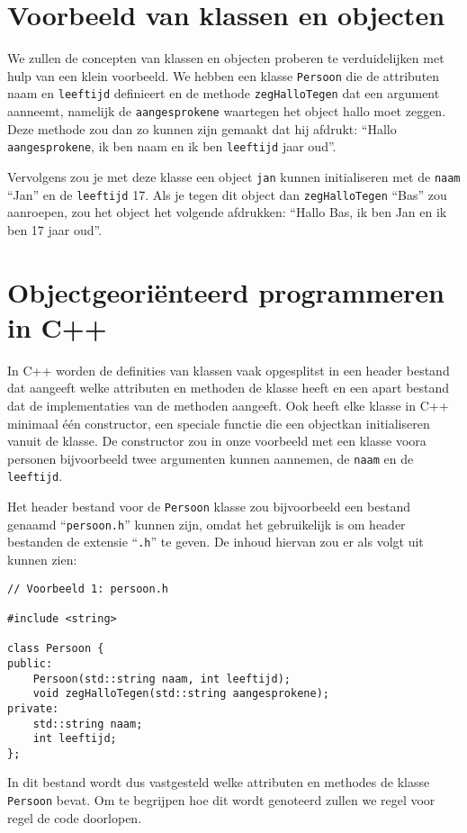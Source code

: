 \documentclass{article}
\begin{document}
\section{Voorbeeld van klassen en objecten}
We zullen de concepten van klassen en objecten proberen te verduidelijken met hulp van een klein voorbeeld. We hebben een klasse \texttt{Persoon} die de attributen naam en \texttt{leeftijd} definieert en de methode \texttt{zegHalloTegen} dat een argument aanneemt, namelijk de \texttt{aangesprokene} waartegen het object hallo moet zeggen. Deze methode zou dan zo kunnen zijn gemaakt dat hij afdrukt: “Hallo \texttt{aangesprokene}, ik ben naam en ik ben \texttt{leeftijd} jaar oud”.

Vervolgens zou je met deze klasse een object \texttt{jan} kunnen initialiseren met de \texttt{naam} “Jan” en de \texttt{leeftijd} 17. Als je tegen dit object dan \texttt{zegHalloTegen} “Bas” zou aanroepen, zou het object het volgende afdrukken: “Hallo Bas, ik ben Jan en ik ben 17 jaar oud”.

\section{Objectgeoriënteerd programmeren in C++}
In C++ worden de definities van klassen vaak opgesplitst in een header bestand dat aangeeft welke attributen en methoden de klasse heeft en een apart bestand dat de implementaties van de methoden aangeeft. Ook heeft elke klasse in C++ minimaal één constructor, een speciale functie die een objectkan initialiseren vanuit de klasse. De constructor zou in onze voorbeeld met een klasse voora personen bijvoorbeeld twee argumenten kunnen aannemen, de \texttt{naam} en de \texttt{leeftijd}.

Het header bestand voor de \texttt{Persoon} klasse zou bijvoorbeeld een bestand genaamd “\texttt{persoon.h}” kunnen zijn, omdat het gebruikelijk is om header bestanden de extensie “\texttt{.h}” te geven. De inhoud hiervan zou er als volgt uit kunnen zien:

\begin{lstlisting}
// Voorbeeld 1: persoon.h

#include <string>

class Persoon {
public:
    Persoon(std::string naam, int leeftijd);
    void zegHalloTegen(std::string aangesprokene);
private:
    std::string naam;
    int leeftijd;
};
\end{lstlisting}

In dit bestand wordt dus vastgesteld welke attributen en methodes de klasse \texttt{Persoon} bevat. Om te begrijpen hoe dit wordt genoteerd zullen we regel voor regel de code doorlopen.
\end{document}
